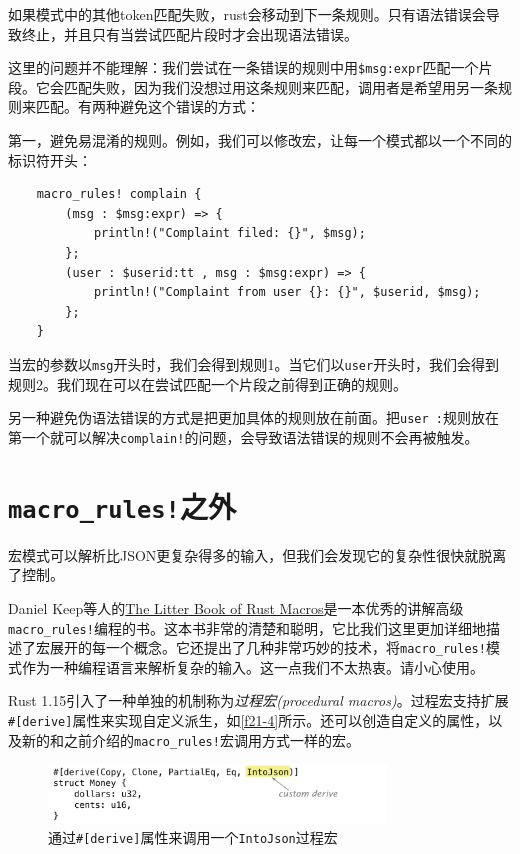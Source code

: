 如果模式中的其他token匹配失败，rust会移动到下一条规则。只有语法错误会导致终止，并且只有当尝试匹配片段时才会出现语法错误。

这里的问题并不能理解：我们尝试在一条错误的规则中用\texttt{\$msg:expr}匹配一个片段。它会匹配失败，因为我们没想过用这条规则来匹配，调用者是希望用另一条规则来匹配。有两种避免这个错误的方式：

第一，避免易混淆的规则。例如，我们可以修改宏，让每一个模式都以一个不同的标识符开头：
\begin{verbatim}
    macro_rules! complain {
        (msg : $msg:expr) => {
            println!("Complaint filed: {}", $msg);
        };
        (user : $userid:tt , msg : $msg:expr) => {
            println!("Complaint from user {}: {}", $userid, $msg);
        };
    }
\end{verbatim}

当宏的参数以\texttt{msg}开头时，我们会得到规则1。当它们以\texttt{user}开头时，我们会得到规则2。我们现在可以在尝试匹配一个片段之前得到正确的规则。

另一种避免伪语法错误的方式是把更加具体的规则放在前面。把\texttt{user :}规则放在第一个就可以解决\texttt{complain!}的问题，会导致语法错误的规则不会再被触发。

\section{\texttt{macro\_rules!}之外}
宏模式可以解析比JSON更复杂得多的输入，但我们会发现它的复杂性很快就脱离了控制。

Daniel Keep等人的\href{https://danielkeep.github.io/tlborm/book/}{The Litter Book of Rust Macros}是一本优秀的讲解高级\texttt{macro\_rules!}编程的书。这本书非常的清楚和聪明，它比我们这里更加详细地描述了宏展开的每一个概念。它还提出了几种非常巧妙的技术，将\texttt{macro\_rules!}模式作为一种编程语言来解析复杂的输入。这一点我们不太热衷。请小心使用。

Rust 1.15引入了一种单独的机制称为\emph{过程宏(procedural macros)}。过程宏支持扩展\texttt{\#[derive]}属性来实现自定义派生，如\autoref{f21-4}所示。还可以创造自定义的属性，以及新的和之前介绍的\texttt{macro\_rules!}宏调用方式一样的宏。

\begin{figure}[htbp]
    \centering
    \includegraphics[width=0.8\textwidth]{../img/f21-4.png}
    \caption{通过\texttt{\#[derive]}属性来调用一个\texttt{IntoJson}过程宏}
    \label{f21-4}
\end{figure}

